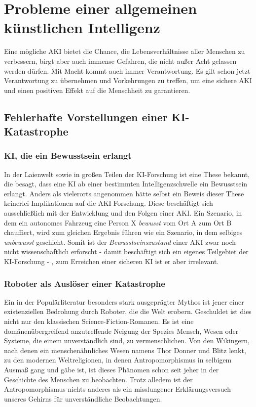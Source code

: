 \chapter{Probleme einer allgemeinen künstlichen Intelligenz}
Eine mögliche AKI bietet die Chance, die Lebensverhältnisse aller Menschen zu verbessern, birgt aber auch immense Gefahren, die nicht außer Acht gelassen werden dürfen. Mit Macht kommt auch immer Verantwortung. Es gilt schon jetzt Verantwortung zu übernehmen und Vorkehrungen zu treffen, um eine sichere AKI und einen positiven Effekt auf die Menschheit zu garantieren.
\section{Fehlerhafte Vorstellungen einer KI-Katastrophe}
\subsection{KI, die ein Bewusstsein erlangt}
In der Laienwelt sowie in großen Teilen der KI-Forschung ist eine These bekannt, die besagt, dass eine KI ab einer bestimmten Intelligenzschwelle ein Bewusstsein erlangt. Anders als vielerorts angenommen hätte selbst ein Beweis dieser These keinerlei Implikationen auf die AKI-Forschung. Diese beschäftigt sich ausschließlich mit der Entwicklung und den Folgen einer AKI. Ein Szenario, in dem ein autonomes Fahrzeug eine Person X \emph{bewusst} vom Ort A zum Ort B chauffiert, wird zum gleichen Ergebnis führen wie ein Szenario, in dem selbiges \emph{unbewusst} geschieht. Somit ist der \emph{Bewusstseinszustand} einer AKI zwar noch nicht wissenschaftlich erforscht - damit beschäftigt sich ein eigenes Teilgebiet der KI-Forschung - , zum Erreichen einer sicheren KI ist er aber irrelevant. 
\subsection{Roboter als Auslöser einer Katastrophe}
Ein in der Populärliteratur besonders stark ausgeprägter Mythos ist jener einer existenziellen Bedrohung durch Roboter, die die Welt erobern. Geschuldet ist dies nicht nur den klassischen Science-Fiction-Romanen. Es ist eine domänenübergreifend anzutreffende Neigung der Spezies Mensch, Wesen oder Systeme, die einem unverständlich sind, zu vermenschlichen. Von den Wikingern, nach denen ein menschenähnliches Wesen namens Thor Donner und Blitz lenkt, zu den modernen Weltreligionen, in denen Antropomorphismus in selbigem Ausmaß gang und gäbe ist, ist dieses Phänomen schon seit jeher in der Geschichte des Menschen zu beobachten. Trotz alledem ist der Antropomorphismus nichts anderes als ein misslungener Erklärungsversuch unseres Gehirns für unverständliche Beobachtungen.

